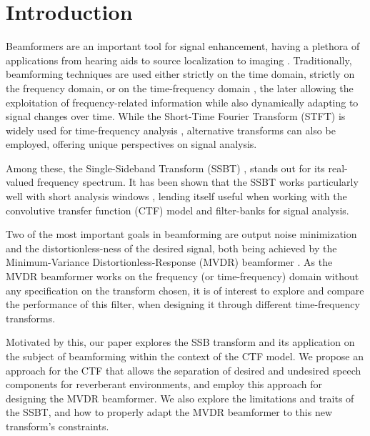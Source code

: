 \section{Introduction}
\label{sec:introduction}

Beamformers are an important tool for signal enhancement, having a plethora of applications from hearing aids \cite{lobato_worst-case-optimization_2020} to source localization \cite{chen_source_2002} to imaging \cite{lu_biomedical_1994,nguyen_minimum_2017}. Traditionally, beamforming techniques are used either strictly on the time domain, strictly on the frequency domain, or on the time-frequency domain \cite{benesty_fundamentals_2017}, the later allowing the exploitation of frequency-related information while also dynamically adapting to signal changes over time. While the Short-Time Fourier Transform (STFT) is widely used for time-frequency analysis \cite{kiymik_comparison_2005,pan_microphone_2021}, alternative transforms \cite{chen_wavelet-based_2018,yang_general_2014,almeida_fractional_1994} can also be employed, offering unique perspectives on signal analysis.

Among these, the Single-Sideband Transform (SSBT) \cite{crochiere_multirate_1983,oyzerman_speech_2012}, stands out for its real-valued frequency spectrum. It has been shown that the SSBT works particularly well with short analysis windows \cite{crochiere_multirate_1983}, lending itself useful when working with the convolutive transfer function (CTF) model \cite{talmon_relative_2009} and filter-banks \cite{kumatani_filter_2008,gopinath_tutorial_1993} for signal analysis.

Two of the most important goals in beamforming are output noise minimization and the distortionless-ness of the desired signal, both being achieved by the Minimum-Variance Distortionless-Response (MVDR) beamformer \cite{capon_high-resolution_1969,erdogan_improved_2016}. As the MVDR beamformer works on the frequency (or time-frequency) domain without any specification on the transform chosen, it is of interest to explore and compare the performance of this filter, when designing it through different time-frequency transforms.

Motivated by this, our paper explores the SSB transform and its application on the subject of beamforming within the context of the CTF model. We propose an approach for the CTF that allows the separation of desired and undesired speech components for reverberant environments, and employ this approach for designing the MVDR beamformer. We also explore the limitations and traits of the SSBT, and how to properly adapt the MVDR beamformer to this new transform's constraints.

